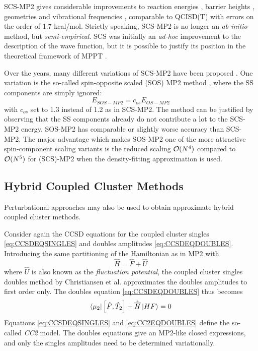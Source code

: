 SCS-MP2 gives considerable improvements to reaction energies \cite{Gri2003}, barrier heights \cite{Gou2004,Bul2004}, geometries and vibrational frequencies \cite{Ger2004}, comparable to QCISD(T) with errors on the order of 1.7 kcal/mol. Strictly speaking, SCS-MP2 is no longer an \emph{ab initio} method, but \emph{semi-empirical}. SCS was initially an \emph{ad-hoc} improvement to the description of the wave function, but it is possible to justify its position in the theoretical framework of MPPT \cite{Sza2006,Fin2010}. 

Over the years, many different variations of SCS-MP2 have been proposed \cite{Jun2004,Loc2005,Dis2007,Hil2007}. One variation is the so-called spin-opposite scaled (SOS) MP2 method \cite{Jun2004}, where the SS components are simply ignored:
\begin{equation}
E_{SOS-MP2} = c_{os} E_{OS-MP2}
\end{equation}
\noindent with $c_{os}$ set to 1.3 instead of 1.2 as in SCS-MP2. The method can be justified by observing that the SS components already do not contribute a lot to the SCS-MP2 energy. SOS-MP2 has comparable or slightly worse accuracy than SCS-MP2. The major advantage which makes SOS-MP2 one of the more attractive spin-component scaling variants is the reduced scaling $\mathcal{O}(N^{4})$ compared to $\mathcal{O}(N^{5})$ for (SCS)-MP2 when the density-fitting approximation is used.

\subsection{Hybrid Coupled Cluster Methods}

Perturbational approaches may also be used to obtain approximate hybrid coupled cluster methods. 

Consider again the CCSD equations for the coupled cluster singles \ref{eq:CCSDEQSINGLES} and doubles amplitudes \ref{eq:CCSDEQDOUBLES}. Introducing the same partitioning of the Hamiltonian as in MP2 with
\begin{equation}
\hat{H} = \hat{F} + \hat{U}
\end{equation}
\noindent where $\hat{U}$ is also known as the \emph{fluctuation potential}, the coupled cluster singles doubles method by Christiansen et al. \cite{Chr1995} approximates the doubles amplitudes to first order only. The doubles equation \ref{eq:CCSDEQDOUBLES} thus becomes
\begin{equation}
\bra{\smash{\mu_2}} \left[ \hat{F}, \hat{T}_2\right] + \hat{\overline{H}} \ket{\smash{HF}} = 0
\label{eq:CC2EQDOUBLES}
\end{equation}
\noindent Equations \ref{eq:CCSDEQSINGLES} and \ref{eq:CC2EQDOUBLES} define the so-called \emph{CC2} model. The doubles equations give an MP2-like closed expressions, and only the singles amplitudes need to be determined variationally.

